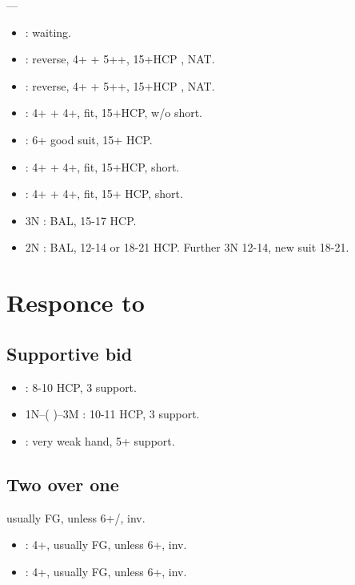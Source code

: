 \documentclass[12pt,twoside,a5paper]{report}%
\begin{document}
	----
	\begin{itemize}
	\renewcommand{\labelitemi}{}
	\item {} : waiting.
	\item {} : reverse, 4+\he{} + 5+\di{}+, 15+HCP , NAT.
	\item {} : reverse, 4+\sp{} + 5+\di{}+, 15+HCP , NAT.
	\item {} :  4+\di{} + 4+\cl{}, fit, 15+HCP, w/o short.
	\item {} : 6+\di{} good suit, 15+ HCP.
	\item {} : 4+\di{} + 4+\cl{}, fit, 15+HCP, short\he{}.
	\item {} : 4+\di{} + 4+\cl{}, fit, 15+ HCP, short\sp{}.
	\item 3N : BAL, 15-17 HCP.
	\item 2N : BAL, 12-14 or 18-21 HCP. Further 3N 12-14, new suit 18-21.
	\end{itemize}

	\chapter*{Responce to }
	
	\section*{Supportive bid}
	\begin{itemize}
	\renewcommand{\labelitemi}{}
	\item {} : 8-10 HCP, 3\he{} support.
	\item 1N--( )--3M : 10-11 HCP, 3\he{} support.
	\item {} : very weak hand, 5+\he{} support.
	\end{itemize}

	\section*{Two over one}
	usually FG, unless 6+\cl{}/\di{}, inv.
	\begin{itemize}
	\renewcommand{\labelitemi}{}
	\item {} : 4+\cl{}, usually FG, unless 6+\cl{}, inv.
	\item {} : 4+\di{}, usually FG, unless 6+\di{}, inv.
	\end{itemize}
	
\end{document}
